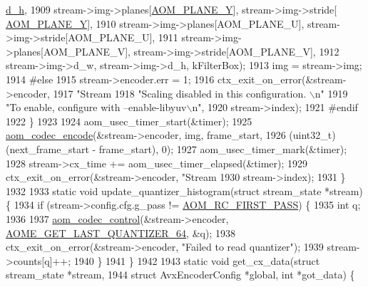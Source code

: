 \begin{DoxyCodeInclude}
{{{{{{{{{{{{{{{{{{{{{{{{{{{{{{{{{{{      \hyperlink{structaom__image_ab986419a1f0fff93a2dc505f47194988}{d\_h},
1909         stream->img->planes[\hyperlink{aom__image_8h_a2ad22076006b15cf809edcaa33f6d339}{AOM\_PLANE\_Y}], stream->img->stride[
      \hyperlink{aom__image_8h_a2ad22076006b15cf809edcaa33f6d339}{AOM\_PLANE\_Y}],
1910         stream->img->planes[AOM\_PLANE\_U], stream->img->stride[AOM\_PLANE\_U],
1911         stream->img->planes[AOM\_PLANE\_V], stream->img->stride[AOM\_PLANE\_V],
1912         stream->img->d\_w, stream->img->d\_h, kFilterBox);
1913     img = stream->img;
1914 \textcolor{preprocessor}{#else}
1915     stream->encoder.err = 1;
1916     ctx\_exit\_on\_error(&stream->encoder,
1917                       \textcolor{stringliteral}{"Stream %
1918                       \textcolor{stringliteral}{"Scaling disabled in this configuration. \(\backslash\)n"}
1919                       \textcolor{stringliteral}{"To enable, configure with --enable-libyuv\(\backslash\)n"},
1920                       stream->index);
1921 \textcolor{preprocessor}{#endif}
1922   \}
1923 
1924   aom\_usec\_timer\_start(&timer);
1925   \hyperlink{group__encoder_ga6f4a777de5389771e783df7ff1f116d4}{aom\_codec\_encode}(&stream->encoder, img, frame\_start,
1926                    (uint32\_t)(next\_frame\_start - frame\_start), 0);
1927   aom\_usec\_timer\_mark(&timer);
1928   stream->cx\_time += aom\_usec\_timer\_elapsed(&timer);
1929   ctx\_exit\_on\_error(&stream->encoder, \textcolor{stringliteral}{"Stream %
1930                     stream->index);
1931 \}
1932 
1933 \textcolor{keyword}{static} \textcolor{keywordtype}{void} update\_quantizer\_histogram(\textcolor{keyword}{struct} stream\_state *stream) \{
1934   \textcolor{keywordflow}{if} (stream->config.cfg.g\_pass != \hyperlink{group__encoder_gga92b6709b58dc3435e3ba652da562eda1ad342b33a290482c20238bfde5d9bea1e}{AOM\_RC\_FIRST\_PASS}) \{
1935     \textcolor{keywordtype}{int} q;
1936 
1937     \hyperlink{group__codec_ga6da974f4eeaba1fa74106b28d0fe6ac5}{aom\_codec\_control}(&stream->encoder, 
      \hyperlink{group__aom__encoder_ggae78dde67a6d78f332e9bdba0dde42db5a17b924cadd3c942f9e57fe6fc4d5e2ab}{AOME\_GET\_LAST\_QUANTIZER\_64}, &q);
1938     ctx\_exit\_on\_error(&stream->encoder, \textcolor{stringliteral}{"Failed to read quantizer"});
1939     stream->counts[q]++;
1940   \}
1941 \}
1942 
1943 \textcolor{keyword}{static} \textcolor{keywordtype}{void} get\_cx\_data(\textcolor{keyword}{struct} stream\_state *stream,
1944                         \textcolor{keyword}{struct} AvxEncoderConfig *global, \textcolor{keywordtype}{int} *got\_data) \{
}}}}}}}}}}}}}}}}}}}}}}}}}}}}}}}}}}}}}
\end{DoxyCodeInclude}
